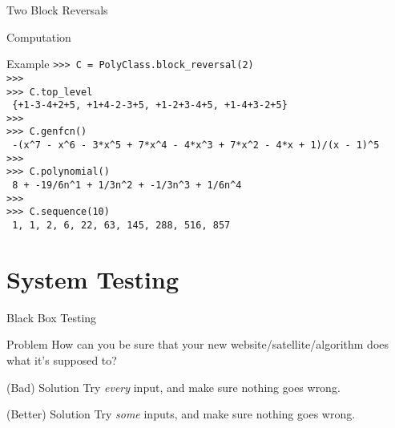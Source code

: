 \documentclass[xcolor=table,dvipsnames]{beamer}
\begin{document}
\begin{frame}{Two Block Reversals}
\begin{center}
\begin{tikzpicture}[scale=.15]
        \end{tikzpicture}
    \end{center}
  \end{frame}

\begin{frame}[fragile]{Computation}

\scriptsize
  \begin{block}{Example}
\verb">>> C = PolyClass.block_reversal(2)"\\
\verb">>>"\\
\verb">>> C.top_level"\\
\verb" {+1-3-4+2+5, +1+4-2-3+5, +1-2+3-4+5, +1-4+3-2+5}"\\
\verb">>>"\\
\verb">>> C.genfcn()"\\
\verb" -(x^7 - x^6 - 3*x^5 + 7*x^4 - 4*x^3 + 7*x^2 - 4*x + 1)/(x - 1)^5"\\
\verb">>>"\\
\verb">>> C.polynomial()"\\
\verb" 8 + -19/6n^1 + 1/3n^2 + -1/3n^3 + 1/6n^4"\\
\verb">>>"\\
\verb">>> C.sequence(10)"\\
\verb" 1, 1, 2, 6, 22, 63, 145, 288, 516, 857 "\\
  \end{block}
  

\end{frame}


  \section{System Testing}
  \begin{frame}
    \centering
    \Large \color{teal}{Combinatorial Testing}
  \end{frame}


  \begin{frame}{Black Box Testing}
    \begin{block}{Problem}
      How can you be sure that your new website/satellite/algorithm does what it's supposed to?
    \end{block}
    \pause
    \begin{block}{(Bad) Solution}
      Try \emph{every} input, and make sure nothing goes wrong.
    \end{block}
    \pause
    \begin{block}{(Better) Solution}
      Try \emph{some} inputs, and make sure nothing goes wrong.
    \end{block}
  \end{frame}
\end{document}
